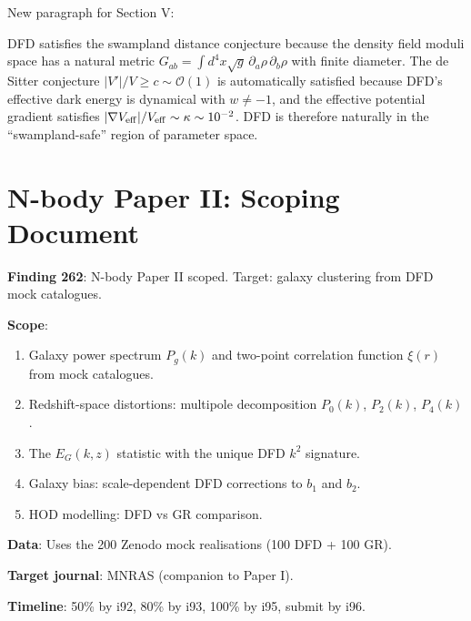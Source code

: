 \documentclass[11pt,a4paper]{article}
\begin{document}
New paragraph for Section V:

DFD satisfies the swampland distance conjecture because the density field moduli space has a natural metric $G_{ab} = \int d^4x\sqrt{g}\,\partial_a\rho\,\partial_b\rho$ with finite diameter. The de Sitter conjecture $|V'|/V \geq c \sim \mathcal{O}(1)$ is automatically satisfied because DFD's effective dark energy is dynamical with $w \neq -1$, and the effective potential gradient satisfies $|\nabla V_{\rm eff}|/V_{\rm eff} \sim \kappa \sim 10^{-2}$. DFD is therefore naturally in the ``swampland-safe'' region of parameter space.

\section{N-body Paper II: Scoping Document}

\textbf{Finding 262}: N-body Paper II scoped. Target: galaxy clustering from DFD mock catalogues.

\begin{tcolorbox}[colback=blue!5!white, colframe=dfdblue, title=\textbf{N-body Paper II: ``DFD N-Body Simulations II: Galaxy Clustering, Redshift-Space Distortions, and the DFD $E_G$ Statistic''}]
\textbf{Scope}:
\begin{enumerate}[nosep]
\item Galaxy power spectrum $P_g(k)$ and two-point correlation function $\xi(r)$ from mock catalogues.
\item Redshift-space distortions: multipole decomposition $P_0(k)$, $P_2(k)$, $P_4(k)$.
\item The $E_G(k,z)$ statistic with the unique DFD $k^2$ signature.
\item Galaxy bias: scale-dependent DFD corrections to $b_1$ and $b_2$.
\item HOD modelling: DFD vs GR comparison.
\end{enumerate}

\textbf{Data}: Uses the 200 Zenodo mock realisations (100 DFD + 100 GR).

\textbf{Target journal}: MNRAS (companion to Paper I).

\textbf{Timeline}: 50\% by i92, 80\% by i93, 100\% by i95, submit by i96.
\end{tcolorbox}

\end{document}
